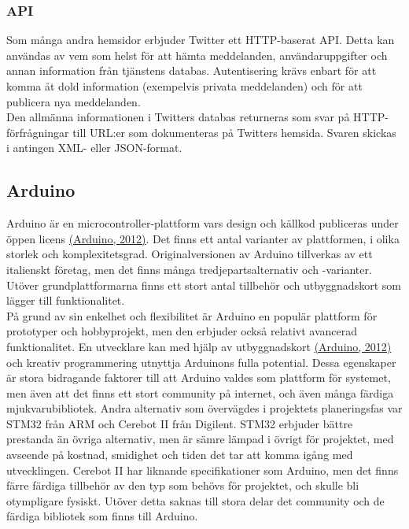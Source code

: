 \documentclass[a4paper,11pt]{article}
\begin{document}
\subsubsection{API}
Som många andra hemsidor erbjuder Twitter ett HTTP-baserat API. Detta kan användas av vem som helst för att hämta meddelanden, användaruppgifter och annan information från tjänstens databas. Autentisering krävs enbart för att komma åt dold information (exempelvis privata meddelanden) och för att publicera nya meddelanden. \\

Den allmänna informationen i Twitters databas returneras som svar på HTTP-förfrågningar till URL:er som dokumenteras på Twitters hemsida. Svaren skickas i antingen XML- eller JSON-format.

\subsection{Arduino}
Arduino är en microcontroller-plattform vars design och källkod publiceras under öppen licens \hyperref[arduino]{(Arduino, 2012)}. Det finns ett antal varianter av plattformen, i olika storlek och komplexitetsgrad. Originalversionen av Arduino tillverkas av ett italienskt företag, men det finns många tredjepartsalternativ och -varianter. Utöver grundplattformarna finns ett stort antal tillbehör och utbyggnadskort som lägger till funktionalitet. \\

På grund av sin enkelhet och flexibilitet är Arduino en populär plattform för prototyper och hobbyprojekt, men den erbjuder också relativt avancerad funktionalitet. En utvecklare kan med hjälp av utbyggnadskort \hyperref[arduino]{(Arduino, 2012)} och kreativ programmering utnyttja Arduinons fulla potential. Dessa egenskaper är stora bidragande faktorer till att Arduino valdes som plattform för systemet, men även att det finns ett stort community på internet, och även många färdiga mjukvarubibliotek. Andra alternativ som övervägdes i projektets planeringsfas var STM32 från ARM och Cerebot II från Digilent. STM32 erbjuder bättre prestanda än övriga alternativ, men är sämre lämpad i övrigt för projektet, med avseende på kostnad, smidighet och tiden det tar att komma igång med utvecklingen. Cerebot II har liknande specifikationer som Arduino, men det finns färre färdiga tillbehör av den typ som behövs för projektet, och skulle bli otympligare fysiskt. Utöver detta saknas till stora delar det community och de färdiga bibliotek som finns till Arduino. \\
\end{document}
